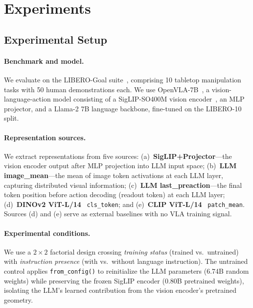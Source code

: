 \section{Experiments}
\label{sec:experiments}

\subsection{Experimental Setup}
\label{sec:setup}

\paragraph{Benchmark and model.}
We evaluate on the LIBERO-Goal suite~\cite{liu2023_libero}, comprising 10 tabletop manipulation tasks with 50 human demonstrations each.
We use OpenVLA-7B~\cite{kim2024_openvla,karamcheti2024}, a vision-language-action model consisting of a SigLIP-SO400M vision encoder~\cite{zhai2023_siglip}, an MLP projector, and a Llama-2 7B language backbone, fine-tuned on the LIBERO-10 split.

\paragraph{Representation sources.}
We extract representations from five sources:
(a)~\textbf{SigLIP+Projector}---the vision encoder output after MLP projection into LLM input space;
(b)~\textbf{LLM image\_mean}---the mean of image token activations at each LLM layer, capturing distributed visual information;
(c)~\textbf{LLM last\_preaction}---the final token position before action decoding (readout token) at each LLM layer;
(d)~\textbf{DINOv2 ViT-L/14}~\cite{oquab2024_dinov2} \texttt{cls\_token}; and
(e)~\textbf{CLIP ViT-L/14}~\cite{radford2021_clip} \texttt{patch\_mean}.
Sources (d) and (e) serve as external baselines with no VLA training signal.

\paragraph{Experimental conditions.}
We use a $2 \times 2$ factorial design crossing \emph{training status} (trained vs.\ untrained) with \emph{instruction presence} (with vs.\ without language instruction).
The untrained control applies \texttt{from\_config()} to reinitialize the LLM parameters (6.74B random weights) while preserving the frozen SigLIP encoder (0.80B pretrained weights), isolating the LLM's learned contribution from the vision encoder's pretrained geometry.

